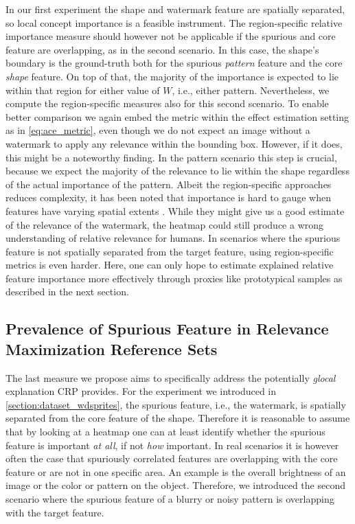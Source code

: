 In our first experiment the shape and watermark feature are spatially separated, so local concept importance is a feasible instrument. The region-specific relative importance measure should however not be applicable if the spurious and core feature are overlapping, as in the second scenario. In this case, the shape's boundary is the ground-truth both for the spurious \textit{pattern} feature and the core \textit{shape} feature. On top of that, the majority of the importance is expected to lie within that region for either value of $W$, i.e., either pattern. Nevertheless, we compute the region-specific measures also for this second scenario. 
To enable better comparison we again embed the metric within the effect estimation setting as in \cref{eq:ace_metric}, even though we do not expect an image without a watermark to apply any relevance within the bounding box. However, if it does, this might be a noteworthy finding. In the pattern scenario this step is crucial, because we expect the majority of the relevance to lie within the shape regardless of the actual importance of the pattern.
Albeit the region-specific approaches reduces complexity, it has been noted that importance is hard to gauge when features have varying spatial extents \citep{Achtibat2022}. 
While they might give us a good estimate of the relevance of the watermark, the heatmap could still produce a wrong understanding of relative relevance for humans. 
In scenarios where the spurious feature is not spatially separated from the target feature, using region-specific metrics is even harder. Here, one can only hope to estimate explained relative feature importance more effectively through proxies like prototypical samples as described in the next section.

\subsection{Prevalence of Spurious Feature in Relevance Maximization Reference Sets}\label{section:relmax_measure}
The last measure we propose aims to specifically address the potentially \textit{glocal} explanation CRP provides. For the experiment we introduced in \cref{section:dataset_wdsprites}, the spurious feature, i.e., the watermark, is spatially separated from the core feature of the shape. Therefore it is reasonable to assume that by looking at a heatmap one can at least identify whether the spurious feature is important \textit{at all}, if not \textit{how} important. 
In real scenarios it is however often the case that spuriously correlated features are overlapping with the core feature or are not in one specific area. An example is the overall brightness of an image or the color or pattern on the object. Therefore, we introduced the second scenario where the spurious feature of a blurry or noisy pattern is overlapping with the target feature.

